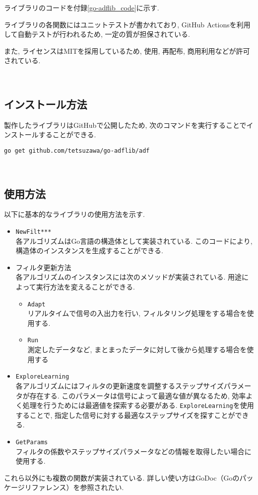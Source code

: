 ライブラリのコードを付録\ref{go-adflib_code}に示す. 

ライブラリの各関数にはユニットテストが書かれており, GitHub
Actionsを利用して自動テストが行われるため, 一定の質が担保されている. 

また, ライセンスはMITを採用しているため, 使用, 再配布, 商用利用などが許可されている. %

\
\subsection{インストール方法}\label{how-to-install}

製作したライブラリはGitHub\cite{go-adflib:online}で公開したため, 次のコマンドを実行することでインストールすることができる. 

\texttt{go\ get\ github.com/tetsuzawa/go-adflib/adf}

\
\subsection{使用方法}\label{how-to-use}

以下に基本的なライブラリの使用方法を示す. 

\begin{itemize}
\tightlist
\item
  \texttt{NewFilt***} \\ 
  各アルゴリズムはGo言語の構造体として実装されている. このコードにより, 構造体のインスタンスを生成することができる. 
\item
  フィルタ更新方法 \\
  各アルゴリズムのインスタンスには次のメソッドが実装されている. 用途によって実行方法を変えることができる. 

  \begin{itemize}
  \tightlist
  \item
    \texttt{Adapt} \\
    リアルタイムで信号の入出力を行い, フィルタリング処理をする場合を使用する. 
  \item
    \texttt{Run} \\
    測定したデータなど, まとまったデータに対して後から処理する場合を使用する
  \end{itemize}
\item
  \texttt{ExploreLearning} \\
  各アルゴリズムにはフィルタの更新速度を調整するステップサイズパラメータが存在する. このパラメータは信号によって最適な値が異なるため, 効率よく処理を行うためには最適値を探索する必要がある. \texttt{ExploreLearning}を使用することで, 指定した信号に対する最適なステップサイズを探すことができる. 
\item
  \texttt{GetParams} \\
  フィルタの係数やステップサイズパラメータなどの情報を取得したい場合に使用する. 
\end{itemize}

これら以外にも複数の関数が実装されている. 詳しい使い方はGoDoc（Goのパッケージリファレンス）\cite{godoc:online}を参照されたい. 
